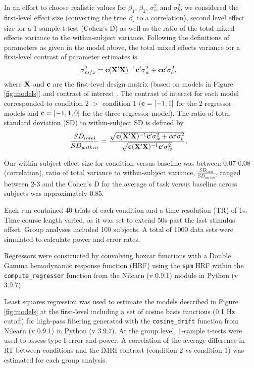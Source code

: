 \documentclass[sn-mathphys,Numbered, super, referee, lineno]{sn-jnl}
\begin{document}
In an effort to choose realistic values for $\beta_1$, $\beta_2$, $\sigma^2_w$ and $\sigma^2_b$, we considered the first-level effect size (converting the true $\beta_i$ to a  correlation), second level effect size for a 1-sample t-test (Cohen's D) as well as the ratio of the total mixed effects variance to the within-subject variance.  Following the definitions of parameters as given in the model above, the total mixed effects variance for a first-level contrast of parameter estimates is
\begin{equation} \label{eq:mfxvar}
 \sigma^2_{mfx} =  \vb{c}(\vb{X}'\vb{X})^{-1}\vb{c}'\sigma^2_{w} +\vb{c}\vb{c}'\sigma^2_b,
\end{equation}
where $\vb{X}$ and $\vb{c}$ are the first-level design matrix (based on models in Figure \ref{fig:models}) and contrast of interest \citep{mumford_modeling_2006}.  The contrast of interest for each model corresponded to condition 2 $>$ condition 1 ($\vb{c}=[-1,1]$ for the 2 regressor models and $\vb{c}=[-1,1, 0]$ for the three regressor model).  The ratio of total standard deviation (SD) to within-subject SD is defined by
\begin{equation}\label{eq:sd_ratio}
\frac{SD_{total}}{SD_{within}} = \frac{\sqrt{\vb{c}(\vb{X}'\vb{X})^{-1}\vb{c}'\sigma^2_{w} + cc'\sigma^2_b}} {\sqrt{\vb{c}(\vb{X}'\vb{X})^{-1}\vb{c}'\sigma^2_{w}}},
\end{equation}

Our within-subject effect size for condition versus baseline was between 0.07-0.08 (correlation), ratio of total variance to within-subject variance, $\frac{SD_{total}}{SD_{within}}$,  ranged between 2-3 and the Cohen's D for the average of task versus baseline across subjects was approximately 0.85.

Each run contained 40 trials of each condition and a time resolution (TR) of 1s.  Time course length varied, as it was set to extend 50s past the last stimulus offset.  Group analyses included 100 subjects.  A total of 1000 data sets were simulated to calculate power and error rates. 


Regressors were constructed by convolving boxcar functions with a Double Gamma hemodynamic response function (HRF) using the \verb+spm+ HRF within the \verb+compute_regressor+ function from the Nilearn (v 0.9.1) module in Python (v 3.9.7).  

Least squares regression was used to estimate the models described in Figure \ref{fig:models} at the first-level including a set of cosine basis functions (0.1 Hz cutoff) for high-pass filtering generated with the \verb+cosine_drift+ function from Nilearn (v 0.9.1) in Python (v 3.9.7).  At the group level, 1-sample t-tests were used to assess type I error and power.  A correlation of the average difference in RT between conditions and the fMRI contrast (condition 2 vs condition 1) was estimated for each group analysis.  
\end{document}
